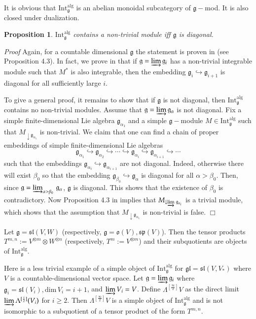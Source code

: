 \documentclass{svmult}
\newtheorem{prop}[theo]{Proposition}
\renewenvironment{proof}{ \emph{Proof}}{$\Box$}
\renewcommand{\sp}{\mathfrak{sp}}
\renewcommand{\sl}{\mathfrak{sl}}
\newcommand{\oo}{\mathfrak{o}}
\renewcommand{\gg}{\mathfrak{g}}
\newcommand{\Int}{\mathrm{Int}}
\newcommand{\alg}{\mathrm{alg}}
\newcommand{\gl}{\mathfrak{gl}}
\begin{document}
It is obvious that  $\mathrm{Int}_{\gg}^\alg$ is an abelian monoidal subcategory of $\gg-$mod. It is also closed under dualization. 

\begin{prop}\label{alg2}  $\mathrm{Int}_{\gg}^\alg$ contains a non-trivial module iff $\gg$ is diagonal.
\end{prop}
\begin{proof} Again, for a countable dimensional $\gg$ the statement is proven in \cite{ps} (see Proposition 4.3). In fact, we prove in \cite{ps} that if $\gg=\varinjlim \gg_i$ has a non-trivial integrable module such that $M^*$ is also integrable, then the embedding  $\gg_i\hookrightarrow\gg_{i+1}$ is diagonal for all sufficiently large $i$.

To give a general proof, it remains to show that if $\gg$ is not diagonal, then $\Int_{\gg}^\alg$ contains no non-trivial modules. Assume that $\gg=\varinjlim \gg_{\alpha}$ is not diagonal. Fix a simple finite-dimensional Lie algebra $\gg_{\alpha_1}$ and a simple $\gg-$module $M \in \mathrm{Int}_{\gg}^\alg$ such that $M_{\downarrow \gg_{\alpha_1}}$ is non-trivial. We claim that one can find a chain of proper embeddings of simple finite-dimensional Lie algebras $$\gg_{\alpha_1} \hookrightarrow \gg_{\alpha_2} \hookrightarrow \cdots \hookrightarrow \gg_{\alpha_i} \hookrightarrow \gg_{\alpha_{i+1}} \hookrightarrow \cdots$$ such that the embeddings $\gg_{\alpha_i} \hookrightarrow \gg_{\alpha_{i+1}}$ are not diagonal. Indeed, otherwise there will exist $\beta_0$ so that the embedding $\gg_{\beta_0} \hookrightarrow \gg_{\alpha}$ is diagonal for all $\alpha > \beta_0$. Then, since $\gg = \varinjlim_{\alpha > \beta_0}\,\gg_{\alpha}$, $\gg$ is diagonal. This shows that the existence of $\beta_0$ is contradictory. 
Now Proposition 4.3 in \cite{ps} implies that $M_{\downarrow\varinjlim\,\gg_{\alpha_i}}$ is a trivial 
module, which shows that the assumption that $M_{\downarrow\gg_{\alpha_1}}$ is non-trivial is false.
\end{proof}

\vspace{0.5cm}

Let $\gg = \sl(V,W)$ (respectively, $\gg = \oo(V), \sp(V)$). Then the tensor products $T^{m,n}:=V^{\otimes m}\otimes W^{\otimes n}$ (respectively, $T^m := V^{\otimes m}$) and their subquotients are objects of $\mathrm{Int}_{\gg}^\alg$. 

Here is a less trivial example of a simple object of $\mathrm{Int}_{\gg}^\alg$ for $\gl = \sl(V,V_*)$ where $V$ is a countable-dimensional vector space. Let $\gg =\varinjlim \gg_i$ where $\gg_i = \sl(V_{i}), \mathrm{dim}\,V_i = i+1$, and $\varinjlim V_{i} = V$. Define $\Lambda^{[\frac{\infty}{2}]}V$ as the direct limit $\varinjlim\Lambda^{[\frac{i}{2}]}(V_i)$ for $i\geq 2$. Then $\Lambda^{[\frac{\infty}{2}]}V$ is a simple object of $\mathrm{Int}_{\gg}^\alg$ and is not isomorphic to a subquotient of a tensor product of the form $T^{m,n}$. 
\end{document}
